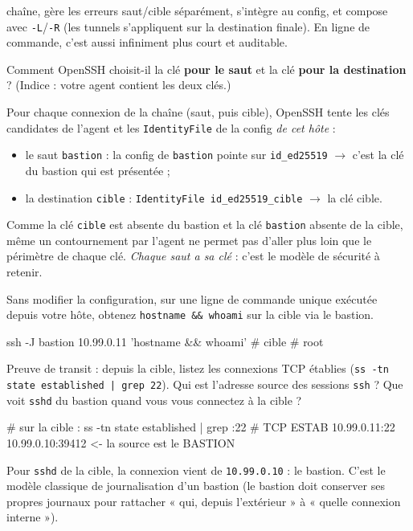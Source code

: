 \documentclass[a4paper,10pt]{exam}
\begin{document}
\begin{questions}
\begin{solution}
chaîne, gère les erreurs saut/cible séparément, s'intègre au config, et compose avec
\texttt{-L}/\texttt{-R} (les tunnels s'appliquent sur la destination finale). En ligne de
commande, c'est aussi infiniment plus court et auditable.
\end{solution}
\question Comment OpenSSH choisit-il la clé \textbf{pour le saut} et la clé \textbf{pour
la destination} ? (Indice : votre agent contient les deux clés.)
\begin{solution}
Pour chaque connexion de la chaîne (saut, puis cible), OpenSSH tente les clés candidates
de l'agent et les \texttt{IdentityFile} de la config \emph{de cet hôte} :
\begin{itemize}
  \item le saut \texttt{bastion} : la config de \texttt{bastion} pointe sur
        \texttt{id\_ed25519} $\rightarrow$ c'est la clé du bastion qui est présentée ;
  \item la destination \texttt{cible} : \texttt{IdentityFile id\_ed25519\_cible} $\rightarrow$
        la clé cible.
\end{itemize}
Comme la clé \texttt{cible} est absente du bastion et la clé \texttt{bastion} absente de la
cible, même un contournement par l'agent ne permet pas d'aller plus loin que le périmètre
de chaque clé. \emph{Chaque saut a sa clé} : c'est le modèle de sécurité à retenir.
\end{solution}
\question Sans modifier la configuration, sur une ligne de commande unique exécutée
depuis votre hôte, obtenez \texttt{hostname \&\& whoami} sur la cible via le bastion.
\begin{solution}
\begin{bashcode}
ssh -J bastion 10.99.0.11 'hostname && whoami'
# cible
# root
\end{bashcode}
\end{solution}
\question Preuve de transit : depuis la cible, listez les connexions TCP établies
(\texttt{ss -tn state established | grep 22}). Qui est l'adresse source des sessions
\texttt{ssh} ? Que voit \texttt{sshd} du bastion quand vous vous connectez à la cible ?
\begin{solution}
\begin{bashcode}
# sur la cible :
ss -tn state established | grep :22
# TCP  ESTAB  10.99.0.11:22    10.99.0.10:39412     <- la source est le BASTION
\end{bashcode}
Pour \texttt{sshd} de la cible, la connexion vient de \texttt{10.99.0.10} : le bastion.
C'est le modèle classique de journalisation d'un bastion (le bastion doit conserver ses
propres journaux pour rattacher « qui, depuis l'extérieur » à « quelle connexion interne »).
\end{solution}
\end{questions}
\end{document}
